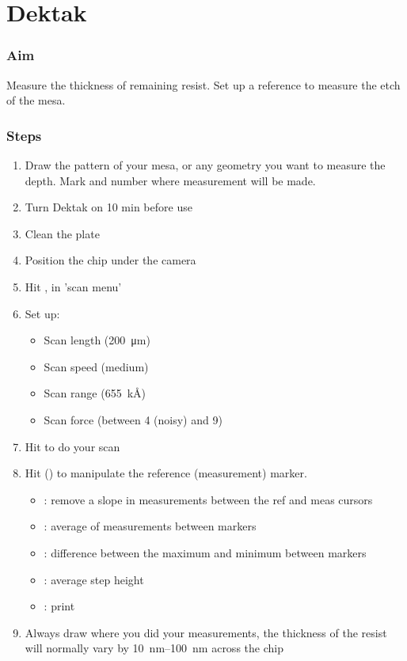 \documentclass[12pt,a4paper]{report}
\begin{document}
\section{Dektak}

\subsubsection{Aim}
Measure the thickness of remaining resist. Set up a reference to measure the etch of the mesa.

\subsubsection{Steps}
\begin{enumerate}
\item Draw the pattern of your mesa, or any geometry you want to measure the depth. Mark and number where measurement will be made.
\item Turn Dektak on 10 min before use
\item Clean the plate
\item Position the chip under the camera
\item Hit ,  in 'scan menu'
\item Set up:
\begin{itemize}[nolistsep, noitemsep]
  \item Scan length (\SI{200}{\micro\meter})
  \item Scan speed (medium)
  \item Scan range (\SI{655}{\kilo\angstrom})
  \item Scan force (between 4 (noisy) and 9)
\end{itemize}
\item Hit  to do your scan
\item Hit  () to manipulate the reference (measurement) marker.
\begin{itemize}[nolistsep, noitemsep]
  \item \noindent {}: remove a slope in measurements between the ref and meas cursors
  \item {}: average of measurements between markers
  \item {}: difference between the maximum and minimum between markers
  \item {}: average step height
  \item {}: print
\end{itemize}
\item Always draw where you did your measurements, the thickness of the resist will normally vary by \SIrange{10}{100}{\nano\meter} across the chip
\end{enumerate}
\end{document}
